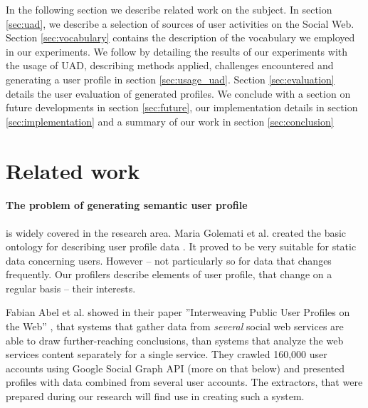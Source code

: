 In the following section we describe related work on the subject. In section \ref{sec:uad}, we describe
a selection of sources of user activities on the Social Web. Section \ref{sec:vocabulary} contains the description of
the vocabulary we employed in our experiments. We follow by detailing the results of our experiments
with the usage of UAD, describing methods applied, challenges encountered and generating a user profile in
section \ref{sec:usage_uad}. Section \ref{sec:evaluation} details the user evaluation of generated profiles.
We conclude with a section on future developments in section \ref{sec:future}, our implementation details
in section \ref{sec:implementation} and a summary of our work in section \ref{sec:conclusion}

\section{Related work}

\paragraph{The problem of generating semantic user profile} is widely covered in the
research area. Maria Golemati et al. created the basic ontology for describing
user profile data \cite{creating-ontology-for-user-profile}. It proved to be
very suitable for static data concerning users. However -- not particularly
so for data that changes frequently. Our profilers describe elements of user
profile, that change on a regular basis -- their interests.  

Fabian Abel et al. showed in their
paper ''Interweaving Public User Profiles on the Web'' \cite{public-profiles},
that systems that gather data from \textit{several} social web services are
able to draw further-reaching conclusions, than systems that analyze the web
services content separately for a single service. They crawled 160,000 user
accounts using Google Social Graph API (more on that below) and presented
profiles with data combined from several user accounts.  The extractors, that
were prepared during our research will find use in creating such a system.

